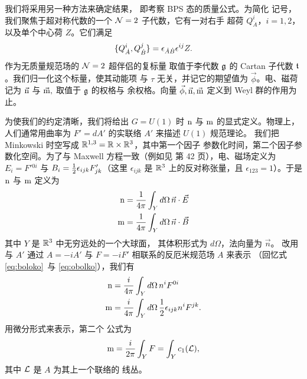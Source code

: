 我们将采用另一种方法来确定结果，
即考察 BPS 态的质量公式。为简化
记号，我们聚焦于超对称代数的一个 ${\EUN}=2$ 子代数，它有一对右手
超荷 $Q_{\dot A}^i$，$i=1,2$，以及单个中心荷
$Z$。它们满足 %
\setcounter{equation}{17}
\begin{equation}\label{eq:hilj}
\{Q_{\dot A}^i,Q_{\dot
B}^j\}=\eps_{\dot A\dot B}\eps^{ij} Z.
\end{equation}
作为无质量规范场的 ${\EUN}=2$ 超伴侣的复标量
取值于李代数 ${\frak g}$ 的 Cartan 子代数 ${\frak t}$。我们归一化这个标量，使其动能项
与 $\tau$ 无关，并记它的期望值为
$\vec{\phi}$。电、磁荷记为
$\vec{\eurm n}$ 与 $\vec{\eurm m},$ 取值于 $\frak g$ 的权格与
余权格。向量 $\vec{\phi},\vec{\eurm
n},\vec{\eurm m}$ 定义到 Weyl 群的作用为止。

为使我们的约定清晰，我们将给出
$G=U(1)$ 时 $\eurm n$ 与 $\eurm m$ 的显式定义。物理上，
人们通常用曲率为 $F'=dA'$ 的实联络 $A'$ 来描述 $U(1)$ 规范理论。
我们把 Minkowski 时空写成
$\Bbb{R}^{1,3}=\Bbb{R}\times \Bbb{R}^3$，其中第一个因子
参数化时间，第二个因子参数化空间。为了与 Maxwell 方程一致（例如见
\cite{ref51} 第 42 页），电、磁场定义为
$E_i=F'{}^{0i}$ 与 $B_i=\half\epsilon_{ijk}F'_{jk}$（这里
$\epsilon_{ijk}$ 是 $\Bbb{R}^3$ 上的反对称张量，且
$\epsilon_{123}=1$）。于是 $\eurm n$ 与 $\eurm m$ 定义为
\setcounter{equation}{18}
\begin{equation}\label{eq:eltro}
\begin{aligned}{\eurm n} & = {1\over 4\pi}\int_Y d\Omega\,
\vec n\cdot \vec E\\ {\eurm m}&={1\over 4\pi}\int_Yd\Omega\,\vec
n\cdot \vec B\\\end{aligned}
\end{equation}
其中 $Y$ 是 $\Bbb{R}^3$ 中无穷远处的一个大球面，
其体积形式为 $d\Omega$，法向量为 $\vec n$。
改用与 $A'$ 通过 $A=-iA'$ 与 $F=-iF'$ 相联系的反厄米规范场 $A$ 来表示
（回忆式 \eqref{eq:boloko}\ 与 \eqref{eq:obolko}），我们有
\setcounter{equation}{19}
\begin{equation}\label{eq:feltro}
\begin{aligned}{\eurm n} & = {i\over 4\pi}\int_Y d\Omega\,
n^i F^{0i}\\ {\eurm m}&={i\over 4\pi}\int_Yd\Omega\,\half
\epsilon_{ijk}n^i F^{jk}.\\\end{aligned}
\end{equation}
用微分形式来表示，第二个
公式为 %
\setcounter{equation}{20}
\begin{equation}\label{eq:ofeltro}
{\eurm m}={i\over 2\pi}\int_YF
=\int_Y c_1({\cal L}),
\end{equation}
其中 ${\cal L}$ 是 $A$ 为其上一个联络的
线丛。

